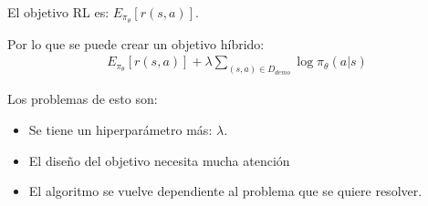 El objetivo RL es: $E_{\pi_\theta}[r(s,a)]$.

Por lo que se puede crear un objetivo híbrido:
 \begin{align}
E_{\pi_\theta}[r(s,a)] + \lambda \sum_{(s,a)\in D_{demo}} \log\pi_\theta(a|s)
\end{align}

Los problemas de esto son:
\begin{itemize}
    \item Se tiene un hiperparámetro más: $\lambda$.
    \item El diseño del objetivo necesita mucha atención
    \item El algoritmo se vuelve dependiente al problema que se quiere resolver.
\end{itemize}
